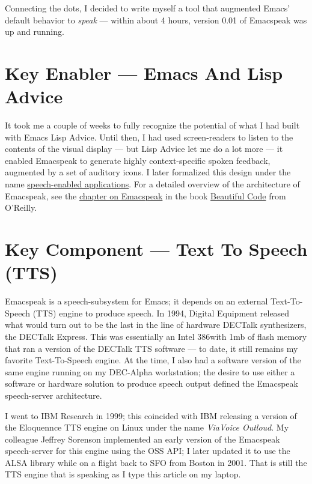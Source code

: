 \documentclass[11pt]{article}
\begin{document}
Connecting the dots, I decided to write myself a tool that
augmented Emacs' default behavior to \emph{speak} — within about 4
hours, version 0.01 of Emacspeak was up and running.


\section{Key Enabler — Emacs And Lisp Advice}
\label{sec:orgd145d26}

It took me a couple of weeks to fully recognize the potential of
what I had built with Emacs Lisp Advice. Until then, I had used
screen-readers to listen to the contents of the visual display —
but Lisp Advice let me do a lot more — it enabled Emacspeak to
generate highly context-specific spoken feedback, augmented by a
set of auditory icons. I later formalized this design under the
name \href{http://en.wikipedia.org/wiki/Self-voicing}{speech-enabled applications}. For a detailed overview of the
architecture of Emacspeak, see the \href{http://emacspeak.sourceforge.net/raman/publications/bc-emacspeak/publish-emacspeak-bc.html}{chapter on Emacspeak} in the
book \href{http://emacspeak.blogspot.com/2007/07/emacspeak-and-beautiful-code.html}{Beautiful Code} from O'Reilly.

\section{Key Component —  Text To Speech (TTS)}
\label{sec:org20ab243}

Emacspeak is a speech-subsystem for Emacs; it depends on an
external Text-To-Speech (TTS) engine to produce speech. In 1994,
Digital Equipment released what would turn out to be the last in
the line of hardware DECTalk synthesizers, the DECTalk
Express. This was essentially an Intel 386with 1mb of flash
memory that ran a version of the DECTalk TTS software — to date,
it still remains my favorite Text-To-Speech engine. At the time,
I also had a software version of the same engine running on my
DEC-Alpha workstation; the desire to use either a software or
hardware solution to produce speech output defined the Emacspeak
speech-server architecture.

I went to IBM Research in 1999; this coincided with IBM releasing
a version of the Eloquennce TTS engine on Linux under the name
\emph{ViaVoice Outloud}. My colleague Jeffrey Sorenson implemented an
early version of the Emacspeak speech-server for this engine
using the OSS API; I later updated it to use the ALSA library
while on a flight back to SFO from Boston in 2001. That is still
the TTS engine that is speaking as I type this article on my
laptop.
\end{document}

